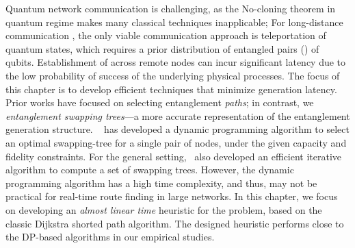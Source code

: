 Quantum network communication is 
challenging, as the No-cloning theorem in quantum regime
makes many classical techniques inapplicable; 
For long-distance communication , 
the only viable communication approach  is 
teleportation of quantum states, which requires a prior distribution of 
entangled pairs (\epss) of qubits.
Establishment of \epss across remote nodes can incur significant 
latency due to the low probability of success of the underlying 
physical processes. 
The focus of this chapter is to develop
efficient techniques that minimize \eps generation latency. Prior works
have focused on selecting entanglement \textit{paths}; in contrast, we   \emph{entanglement swapping trees}---a more accurate 
representation of the entanglement generation structure. 
~\cite{swapping-tqe-22} has developed a dynamic programming algorithm 
to select an optimal swapping-tree for a single pair of nodes, under the given capacity
and fidelity constraints. For the general setting,~\cite{swapping-tqe-22} also developed an 
efficient iterative algorithm to compute a set of swapping trees.
However, the dynamic programming algorithm has a high time complexity, and thus, may not
be practical for real-time route finding in large networks.
In this chapter, we focus on developing an \emph{almost linear time} heuristic for the \spp problem,
based on the classic Dijkstra shorted path algorithm.
The designed heuristic performs close to the DP-based algorithms in our empirical studies.